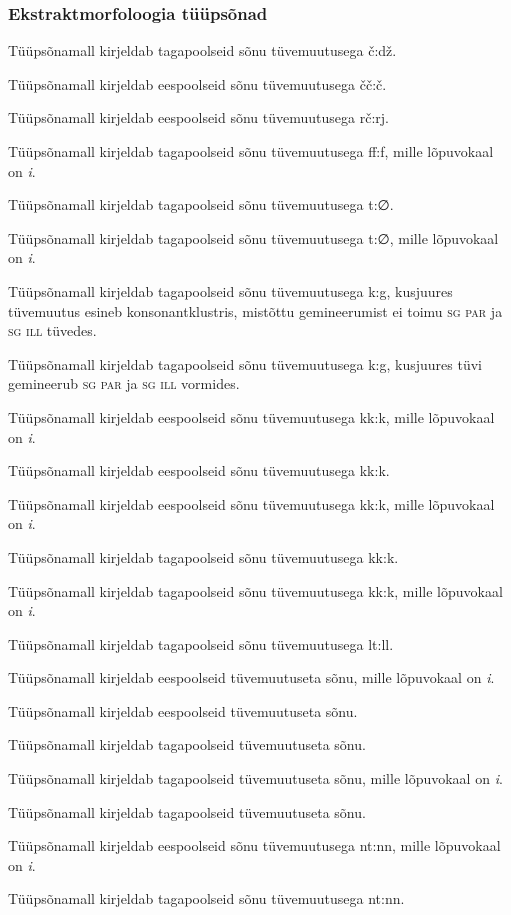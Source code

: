 \documentclass[12pt,a4paper]{article}
\newcommand{\msd}[1]{\textsc{#1}}
\begin{document}
\subsubsection*{Ekstraktmorfoloogia tüüpsõnad}
\vspace{-3.5em}

Tüüpsõna\-mall kirjeldab tagapoolseid sõnu tüvemuutusega č:dž.

Tüüpsõna\-mall kirjeldab eespoolseid sõnu tüvemuutusega čč:č.

Tüüpsõna\-mall kirjeldab eespoolseid sõnu tüvemuutusega rč:rj.

Tüüpsõna\-mall kirjeldab tagapoolseid sõnu tüvemuutusega ff:f, mille lõpuvokaal on \textit{i}. %

Tüüpsõna\-mall kirjeldab tagapoolseid sõnu tüvemuutusega t:∅. %

Tüüpsõna\-mall kirjeldab tagapoolseid sõnu tüvemuutusega t:∅, mille lõpuvokaal on \textit{i}. %

Tüüpsõna\-mall kirjeldab tagapoolseid sõnu tüvemuutusega k:g, kusjuures tüvemuutus esineb konsonant\-klustris, mistõttu gemineerumist ei toimu \msd{sg par} ja \msd{sg ill} tüvedes.

Tüüpsõna\-mall kirjeldab tagapoolseid sõnu tüvemuutusega k:g, kusjuures tüvi gemineerub \msd{sg par} ja \msd{sg ill} vormides.

Tüüpsõna\-mall kirjeldab eespoolseid sõnu tüvemuutusega kk:k, mille lõpuvokaal on \textit{i}. %

Tüüpsõna\-mall kirjeldab eespoolseid sõnu tüvemuutusega kk:k.

Tüüpsõna\-mall kirjeldab eespoolseid sõnu tüvemuutusega kk:k, mille lõpuvokaal on \textit{i}. %

Tüüpsõna\-mall kirjeldab tagapoolseid sõnu tüvemuutusega kk:k.

Tüüpsõna\-mall kirjeldab tagapoolseid sõnu tüvemuutusega kk:k, mille lõpuvokaal on \textit{i}. %

Tüüpsõna\-mall kirjeldab tagapoolseid sõnu tüvemuutusega lt:ll.

Tüüpsõna\-mall kirjeldab eespoolseid tüvemuutuseta sõnu, mille lõpuvokaal on \textit{i}. %

Tüüpsõna\-mall kirjeldab eespoolseid tüvemuutuseta sõnu.

Tüüpsõna\-mall kirjeldab tagapoolseid tüvemuutuseta sõnu.

Tüüpsõna\-mall kirjeldab tagapoolseid tüvemuutuseta sõnu, mille lõpuvokaal on \textit{i}. %

Tüüpsõna\-mall kirjeldab tagapoolseid tüvemuutuseta sõnu.

Tüüpsõna\-mall kirjeldab eespoolseid sõnu tüvemuutusega nt:nn, mille lõpuvokaal on \textit{i}.

Tüüpsõna\-mall kirjeldab tagapoolseid sõnu tüvemuutusega nt:nn.
\end{document}
